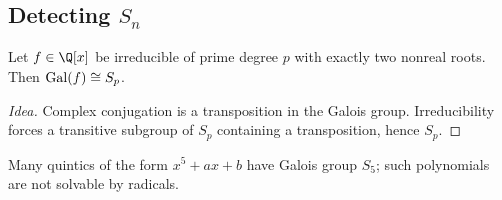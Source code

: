 \subsection{Detecting $S_n$}
\begin{proposition}
Let $f\in\Q[x]$ be irreducible of prime degree $p$ with exactly two nonreal roots. Then $\operatorname{Gal}(f)\cong S_p$.
\end{proposition}
\begin{proof}[Idea]
Complex conjugation is a transposition in the Galois group. Irreducibility forces a transitive subgroup of $S_p$ containing a transposition, hence $S_p$.
\end{proof}
\begin{example}
Many quintics of the form $x^5+ax+b$ have Galois group $S_5$; such polynomials are not solvable by radicals.
\end{example}

